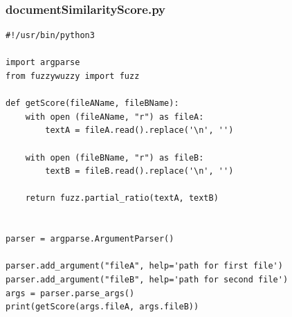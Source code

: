 \subsubsection{documentSimilarityScore.py}
\begin{lstlisting}
#!/usr/bin/python3

import argparse
from fuzzywuzzy import fuzz

def getScore(fileAName, fileBName):
	with open (fileAName, "r") as fileA:
		textA = fileA.read().replace('\n', '')

	with open (fileBName, "r") as fileB:
		textB = fileB.read().replace('\n', '')

	return fuzz.partial_ratio(textA, textB)


parser = argparse.ArgumentParser()

parser.add_argument("fileA", help='path for first file')
parser.add_argument("fileB", help='path for second file')
args = parser.parse_args()
print(getScore(args.fileA, args.fileB))
\end{lstlisting}




